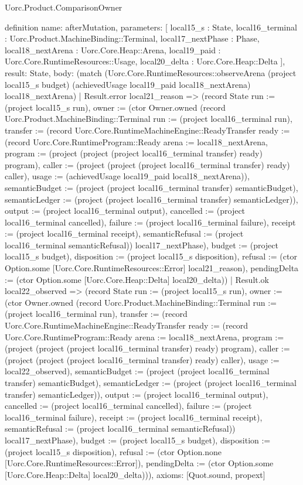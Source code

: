 \begin{lexlean}{Uorc.Product.ComparisonOwner}
\begin{semanticmodule}
definition{
  name: afterMutation,
  parameters: [
    local15_s : State,
    local16_terminal : Uorc.Product.MachineBinding::Terminal,
    local17_nextPhase : Phase,
    local18_nextArena : Uorc.Core.Heap::Arena,
    local19_paid : Uorc.Core.RuntimeResources::Usage,
    local20_delta : Uorc.Core.Heap::Delta
  ],
  result: State,
  body: (match (Uorc.Core.RuntimeResources::observeArena (project local15_s budget) (achievedUsage local19_paid local18_nextArena) local18_nextArena)
    | Result.error local21_reason => (record State {run := (project local15_s run), owner := (ctor Owner.owned (record Uorc.Product.MachineBinding::Terminal {run := (project local16_terminal run), transfer := (record Uorc.Core.RuntimeMachineEngine::ReadyTransfer {ready := (record Uorc.Core.RuntimeProgram::Ready {arena := local18_nextArena, program := (project (project (project local16_terminal transfer) ready) program), caller := (project (project (project local16_terminal transfer) ready) caller), usage := (achievedUsage local19_paid local18_nextArena)}), semanticBudget := (project (project local16_terminal transfer) semanticBudget), semanticLedger := (project (project local16_terminal transfer) semanticLedger)}), output := (project local16_terminal output), cancelled := (project local16_terminal cancelled), failure := (project local16_terminal failure), receipt := (project local16_terminal receipt), semanticRefusal := (project local16_terminal semanticRefusal)}) local17_nextPhase), budget := (project local15_s budget), disposition := (project local15_s disposition), refusal := (ctor Option.some [Uorc.Core.RuntimeResources::Error] local21_reason), pendingDelta := (ctor Option.some [Uorc.Core.Heap::Delta] local20_delta)})
    | Result.ok local22_observed => (record State {run := (project local15_s run), owner := (ctor Owner.owned (record Uorc.Product.MachineBinding::Terminal {run := (project local16_terminal run), transfer := (record Uorc.Core.RuntimeMachineEngine::ReadyTransfer {ready := (record Uorc.Core.RuntimeProgram::Ready {arena := local18_nextArena, program := (project (project (project local16_terminal transfer) ready) program), caller := (project (project (project local16_terminal transfer) ready) caller), usage := local22_observed}), semanticBudget := (project (project local16_terminal transfer) semanticBudget), semanticLedger := (project (project local16_terminal transfer) semanticLedger)}), output := (project local16_terminal output), cancelled := (project local16_terminal cancelled), failure := (project local16_terminal failure), receipt := (project local16_terminal receipt), semanticRefusal := (project local16_terminal semanticRefusal)}) local17_nextPhase), budget := (project local15_s budget), disposition := (project local15_s disposition), refusal := (ctor Option.none [Uorc.Core.RuntimeResources::Error]), pendingDelta := (ctor Option.some [Uorc.Core.Heap::Delta] local20_delta)})),
  axioms: [Quot.sound, propext]
}


\end{semanticmodule}
\end{lexlean}
